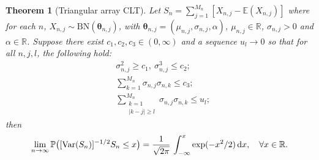 \documentclass[12pt]{article}
\newtheorem{theorem}{Theorem}[section]
\theoremstyle{definition}
\begin{document}
\begin{theorem}[Triangular array CLT]
Let $S_n=\sum_{j=1}^{M_n}[X_{n,j}-\mathbb{E}(X_{n,j})]$ 
where for each $n$, $X_{n,j}\sim\text{BN}(\boldsymbol{\theta}_{n,j})$, with
$\boldsymbol{\theta}_{n,j}=(\mu_{n,j},\sigma_{n,j},\alpha)$, $\mu_{n,j}\in\mathbb{R}$, $\sigma_{n,j}>0$ and $\alpha\in \mathbb{R}$.
Suppose there exist $c_1,c_2,c_3\in(0,\infty)$ and a sequence $u_l\to 0$ so that for all $n,j,l$, the following hold:
\begin{align}
& \sigma_{n,j}^2\geq c_1, \ \sigma_{n,j}^3\leq c_2; \label{Assumptions}
\\[0,1cm]
& \sum_{k=1}^{M_n} \sigma_{n,j}\sigma_{n,k}\leq c_3; \label{Assumptions-1}
\\[0,1cm]
&
\sum_{\substack{k=1 \\ \vert k-j\vert\geq l}}^{M_n} \sigma_{n,j}\sigma_{n,k} \leq u_l; \label{Assumptions-2}
\end{align}	
	then
	\begin{align*}
\lim_{n\to\infty}
\mathbb{P}\big([{\rm Var}(S_n)]^{-1/2} S_n \leq x\big)
=
{1\over \sqrt{2\pi}}\, \int_{-\infty}^x \exp(-x^2/2) \, {\rm d} x, 
\quad \forall x\in\mathbb{R}.
	\end{align*}
\end{theorem}
\end{document}
